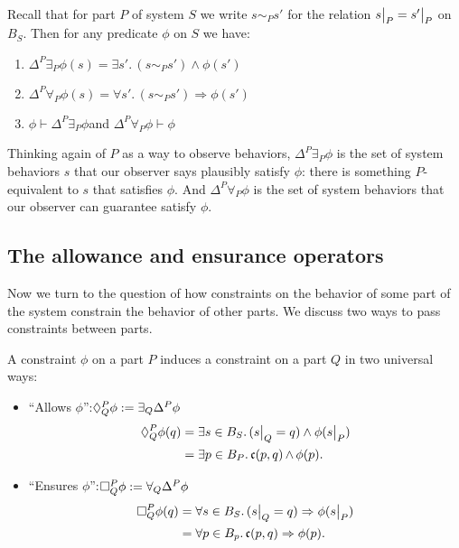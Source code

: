 \begin{lemma}\label{Thing:lem:Global.Modality.Props}
Recall that for part $P$ of system $S$ we write $s \sim_P s'$ for the relation $\rest{s}{P} = \rest{s'}{P}$ on $B_S$. Then for any predicate $\phi$ on $S$ we have:
\begin{enumerate}
    \item $\Delta^P \exists_P \phi(s) = \exists s'.\, (s\sim_P s') \wedge \phi(s')$
    \item $\Delta^P \forall_P \phi(s) = \forall s'.\, (s \sim_P s') \Rightarrow \phi(s')$
    \item $\phi \vdash \Delta^P \exists_P \phi$\quad and \quad $\Delta^P \forall_P \phi \vdash \phi$
\end{enumerate}
\end{lemma}
Thinking again of $P$ as a way to observe behaviors,
$\Delta^P \exists_P \phi$ is the set of system behaviors $s$ that our observer says plausibly satisfy $\phi$: there is something $P$-equivalent to $s$ that satisfies $\phi$. And $\Delta^P \forall_P \phi$ is the set of system behaviors that our observer can guarantee satisfy $\phi$.

\subsection{The allowance and ensurance operators}\label{subsec.compat_ensure}
Now we turn to the question of how constraints on the behavior of some part of the system constrain the behavior of other parts. We discuss two ways to pass constraints between parts.

     \begin{defn}\label{defn:intermodalities}
        A constraint $\phi$ on a part $P$ induces a constraint on a part $Q$ in two universal ways:
        \begin{itemize}
            \item ``Allows $\phi$'':\quad $\allows{P}{Q}\phi := \exists_Q \Delta^P\phi$
                \begin{align*}
               \allows{P}{Q} \phi(q) &=  \exists s \in B_S.\, (\rest{s}{Q} = q) \wedge \phi(\rest{s}{P})\\
               &= \exists p \in B_P.\, \mathfrak{c}(p, q) \meet \phi(p).
                \end{align*}
            \item ``Ensures $\phi$'':\quad $\ensure{P}{Q}\phi := \forall_Q  \Delta^P\phi$
                \begin{align*}
                \ensure{P}{Q} \phi(q) &= \forall s \in B_S.\, (\rest{s}{Q} = q) \Rightarrow \phi(\rest{s}{P})\\
                &= \forall p \in B_p.\, \mathfrak{c}(p, q) \Rightarrow \phi(p).
                \end{align*}
        \end{itemize} 
    \end{defn}
    
